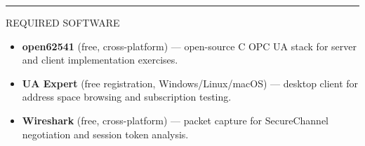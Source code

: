 \documentclass[10pt]{article}
\begin{document}
\smallskip
{\color{unavy}\rule{\linewidth}{0.4pt}}
\smallskip
{\small\sffamily\color{ugray}\MakeUppercase{Required Software}}
\smallskip

\begin{itemize}\small
  \item \textbf{open62541} (free, cross-platform) — open-source C OPC UA stack for server and client implementation exercises.
  \item \textbf{UA Expert} (free registration, Windows/Linux/macOS) — desktop client for address space browsing and subscription testing.
  \item \textbf{Wireshark} (free, cross-platform) — packet capture for SecureChannel negotiation and session token analysis.
\end{itemize}


\vfill

\end{document}
